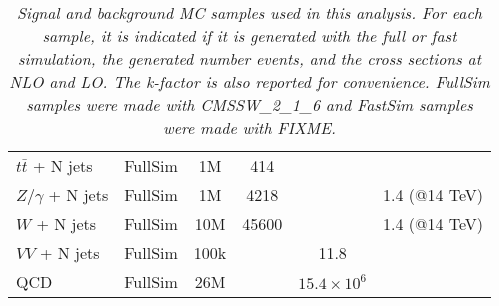 \begin{table}[htb]
\begin{center}
\begin{tabular}{|l|ccccc|}
      $t\bar{t}$ + N jets       & FullSim      &  1M       & 414                 &                    & \\
      $Z/\gamma$ + N jets       & FullSim      &  1M       & 4218                &                    & 1.4 (@14 TeV)\\
      $W$ + N jets              & FullSim      & 10M       & 45600               &                    & 1.4 (@14 TeV)\\
      $VV$ + N jets             & FullSim      & 100k      &                     & 11.8               & \\
      QCD                       & FullSim      & 26M       &                     & $15.4 \times 10^6$ & \\
       \hline\hline
    \end{tabular}
    \caption{\small \sl Signal and background MC samples used in this analysis. For each sample, it is indicated 
      if it is generated with the full or fast simulation, the generated number events, and the cross sections at NLO and LO. 
      The k-factor is also reported for convenience.
      FullSim samples were made with CMSSW\_2\_1\_6 and FastSim samples were made with FIXME.}
  \end{center}
\end{table}

 


%


